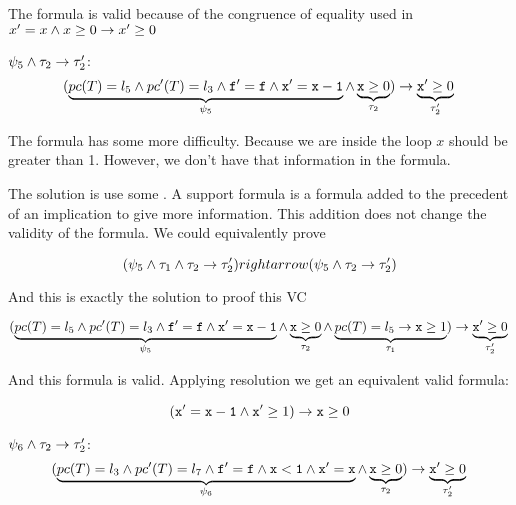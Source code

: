	The formula is valid because of the congruence of equality used in  $x'=x \wedge x\geq 0 \to x'\geq 0$ 

	\; $\psi_5 \wedge \tau_2 \to \tau_2'$:	
	\begin{equation*}
		(
			\underbrace{pc(T) = l_5 \wedge pc'(T) = l_3 \wedge \mathtt{f'=f} \wedge \mathtt{x'=x-1}}_{\psi_5} \wedge \underbrace{\mathtt{x} \geq 0}_{\tau_2}
		) 
			\to \underbrace{\mathtt{x}' \geq 0}_{\tau_2'}\\\\
	\end{equation*}


	The formula has some more difficulty. 
	Because we are inside the loop $x$ should be greater than 1.
	However, we don't have that information in the formula.
	
	The solution is use some .
	A support formula is a formula added to the precedent of an implication to give more information. 
	This addition does not change the validity of the formula.
	We could equivalently prove

	\[
		(\psi_5 \wedge \tau_1 \wedge \tau_2 \to \tau_2') rightarrow (\psi_5\wedge \tau_2\to\tau_2')
	\]

	And this is exactly the solution to proof this \gls{VC}

	

	\begin{equation*}
		(
			\underbrace{pc(T) = l_5 \wedge pc'(T) = l_3 \wedge \mathtt{f'=f} \wedge \mathtt{x'=x-1}}_{\psi_5} \wedge \underbrace{\mathtt{x} \geq 0}_{\tau_2} \wedge \underbrace{pc(T) = l_5 \to \mathtt{x} \geq 1}_{\tau_1}
		) 
			\to \underbrace{\mathtt{x}' \geq 0}_{\tau_2'}\\\\
	\end{equation*}


	And this formula is valid. Applying resolution we get an equivalent valid formula:

	\[
		( \mathtt{x'=x-1} \wedge \mathtt{x'}\geq 1) \to \mathtt{x} \geq 0
	\]


	\; $\psi_6 \wedge \tau_2 \to \tau_2'$:
	\begin{equation*}
		(
			\underbrace{pc(T) = l_3 \wedge pc'(T) = l_7 \wedge \mathtt{f'=f} \wedge \mathtt{x<1} \wedge \mathtt{x'=x} }_{\psi_6} \wedge \underbrace{\mathtt{x} \geq 0}_{\tau_2}
		) 
			\to \underbrace{\mathtt{x}' \geq 0}_{\tau_2'}\\\\
	\end{equation*}


